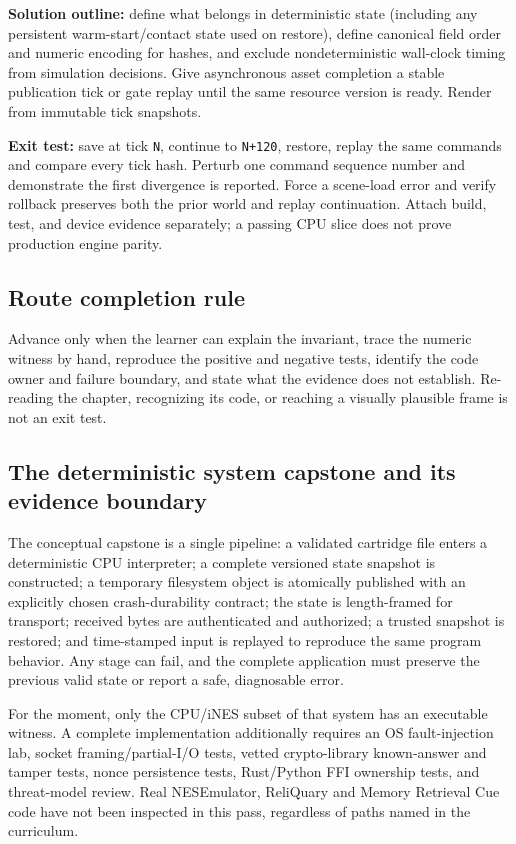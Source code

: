 \textbf{Solution outline:} define what belongs in deterministic state (including any persistent warm-start/contact state used on restore), define canonical field order and numeric encoding for hashes, and exclude nondeterministic wall-clock timing from simulation decisions. Give asynchronous asset completion a stable publication tick or gate replay until the same resource version is ready. Render from immutable tick snapshots.

\textbf{Exit test:} save at tick \texttt{N}, continue to \texttt{N+120}, restore, replay the same commands and compare every tick hash. Perturb one command sequence number and demonstrate the first divergence is reported. Force a scene-load error and verify rollback preserves both the prior world and replay continuation. Attach build, test, and device evidence separately; a passing CPU slice does not prove production engine parity.

\subsection{Route completion rule}\label{route-completion-rule}

Advance only when the learner can explain the invariant, trace the numeric witness by hand, reproduce the positive and negative tests, identify the code owner and failure boundary, and state what the evidence does not establish. Re-reading the chapter, recognizing its code, or reaching a visually plausible frame is not an exit test.

\subsection{The deterministic system capstone and its evidence boundary}\label{the-deterministic-system-capstone-and-its-evidence-boundary}

The conceptual capstone is a single pipeline: a validated cartridge file enters a deterministic CPU interpreter; a complete versioned state snapshot is constructed; a temporary filesystem object is atomically published with an explicitly chosen crash-durability contract; the state is length-framed for transport; received bytes are authenticated and authorized; a trusted snapshot is restored; and time-stamped input is replayed to reproduce the same program behavior. Any stage can fail, and the complete application must preserve the previous valid state or report a safe, diagnosable error.

For the moment, only the CPU/iNES subset of that system has an executable witness. A complete implementation additionally requires an OS fault-injection lab, socket framing/partial-I/O tests, vetted crypto-library known-answer and tamper tests, nonce persistence tests, Rust/Python FFI ownership tests, and threat-model review. Real NESEmulator, ReliQuary and Memory Retrieval Cue code have not been inspected in this pass, regardless of paths named in the curriculum.

